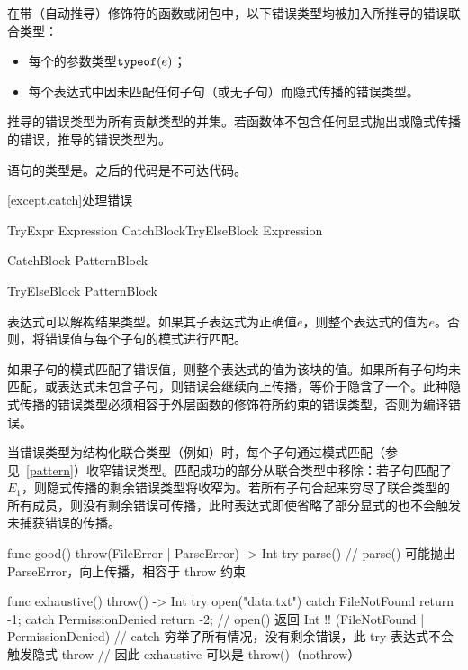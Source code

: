 \pnum
在带（自动推导）修饰符的函数或闭包中，以下错误类型均被加入所推导的错误联合类型：
\begin{itemize}
\item 每个的参数类型$\texttt{typeof}(e)$；
\item 每个表达式中因未匹配任何子句（或无子句）而隐式传播的错误类型。
\end{itemize}
推导的错误类型为所有贡献类型的并集。若函数体不包含任何显式抛出或隐式传播的错误，推导的错误类型为。

\pnum
{}语句的类型是。之后的代码是不可达代码。

[except.catch]{处理错误}

\begin{bnf}{TryExpr}
     Expression CatchBlock\bnfp TryElseBlock\bnfq \br
     Expression
\end{bnf}

\begin{bnf}{CatchBlock}
     Pattern\bnfq Block
\end{bnf}

\begin{bnf}{TryElseBlock}
     Pattern\bnfq Block
\end{bnf}

\pnum
{}表达式可以解构结果类型。如果其子表达式为正确值$e$，则整个表达式的值为$e$。否则，将错误值与每个子句的模式进行匹配。

\pnum
如果子句的模式匹配了错误值，则整个表达式的值为该块的值。如果所有子句均未匹配，或表达式未包含子句，则错误会继续向上传播，等价于隐含了一个。此种隐式传播的错误类型必须相容于外层函数的修饰符所约束的错误类型，否则为编译错误。

\pnum
当错误类型为结构化联合类型（例如）时，每个子句通过模式匹配（参见~\ref{pattern}）收窄错误类型。匹配成功的部分从联合类型中移除：若子句匹配了$E_1$，则隐式传播的剩余错误类型将收窄为。若所有子句合起来穷尽了联合类型的所有成员，则没有剩余错误可传播，此时表达式即使省略了部分显式的也不会触发未捕获错误的传播。

\pnum
\enterexample
\begin{codeblock}
func good() throw(FileError | ParseError) -> Int {
    try parse()  // parse() 可能抛出 ParseError，向上传播，相容于 throw 约束
}

func exhaustive() throw() -> Int {
    try open("data.txt")
        catch FileNotFound { return -1; }
        catch PermissionDenied { return -2; }
    // open() 返回 Int !! (FileNotFound | PermissionDenied)
    // catch 穷举了所有情况，没有剩余错误，此 try 表达式不会触发隐式 throw
    // 因此 exhaustive 可以是 throw()（nothrow）
}
\end{codeblock}
\exitexample

